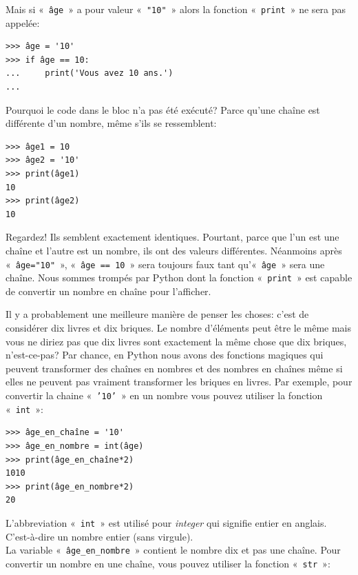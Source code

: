 Mais si « \texttt{âge} »  a pour valeur « \texttt{"10"} » alors la fonction « \texttt{print} » ne sera pas appelée:

\begin{Verbatim}[frame=single,rulecolor=\color{green}, label=à taper avec attention]
>>> âge = '10'
>>> if âge == 10:
...     print('Vous avez 10 ans.')
...
\end{Verbatim}

Pourquoi le code dans le bloc n'a pas été exécuté? Parce qu'une chaîne est différente d'un nombre, même s'ils se ressemblent:

\begin{Verbatim}[frame=single,rulecolor=\color{mbleu}, label=à taper]
>>> âge1 = 10
>>> âge2 = '10'
>>> print(âge1)
10
>>> print(âge2)
10
\end{Verbatim}

Regardez! Ils semblent exactement identiques. Pourtant, parce que l'un est une chaîne et l'autre est un nombre, ils ont des valeurs différentes. Néanmoins après « \texttt{âge="10"} », « \texttt{âge == 10} »  sera toujours faux tant qu'« \texttt{âge} » sera une chaîne.  Nous sommes trompés par Python dont la fonction « \texttt{print} » est capable de convertir un nombre en chaîne pour l'afficher.

Il y a probablement une meilleure manière de penser les choses: c'est de considérer dix livres et dix briques. Le nombre d'éléments peut être le même mais vous ne diriez pas que dix livres sont exactement la même chose que dix briques, n'est-ce-pas? Par chance, en Python nous avons des fonctions magiques qui peuvent transformer des chaînes en nombres et des nombres en chaînes même si elles ne peuvent pas vraiment transformer les briques en livres. Par exemple, pour convertir la chaine « \texttt{'10'} »  en un nombre vous pouvez utiliser la fonction « \texttt{int} »: 

\begin{Verbatim}[frame=single,rulecolor=\color{mbleu}, label=à taper]
>>> âge_en_chaîne = '10'
>>> âge_en_nombre = int(âge)
>>> print(âge_en_chaîne*2)
1010
>>> print(âge_en_nombre*2)
20
\end{Verbatim}

L'abbreviation « \texttt{int} »  est utilisé  pour \emph{integer} qui signifie entier en anglais. C'est-à-dire un nombre entier (sans virgule).\\

La variable « \texttt{âge\_en\_nombre} » contient le nombre dix et pas une chaîne. Pour convertir un nombre en une chaîne, vous pouvez utiliser la fonction « \texttt{str} »:


